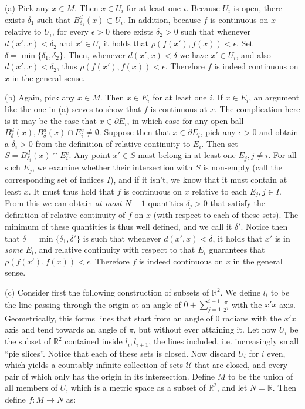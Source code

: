 \begin{solution}
    
    (a) Pick any $x \in M$.
    Then $x \in U_i$ for at least one $i$.
    Because $U_i$ is open, there exists $\delta_1$ such that $B_{\delta_1}^{d}(x) \subset U_i$.
    In addition, because $f$ is continuous on $x$ relative to $U_i$, for every $\epsilon > 0$ there exists $\delta_2 > 0$ such that whenever $d(x', x) < \delta_2$ and $x' \in U_i$ it holds that $\rho(f(x'), f(x)) < \epsilon$.
    Set $\delta = \min\{\delta_1, \delta_2\}$.
    Then, whenever $d(x', x) < \delta$ we have $x' \in U_i$, and also $d(x', x) < \delta_2$, thus $\rho(f(x'), f(x)) < \epsilon$.
    Therefore $f$ is indeed continuous on $x$ in the general sense.

    (b) Again, pick any $x \in M$.
    Then $x \in E_i$ for at least one $i$.
    If $x \in \mathring{E_i}$, an argument like the one in (a) serves to show that $f$ is continuous at $x$.
    The complication here is it may be the case that $x \in \partial E_i$, in which case for any open ball $B_{\delta}^{d}(x), B_{\delta}^{d}(x) \cap E_i^{c} \neq \emptyset$.
    Suppose then that $x \in \partial E_i$, pick any $\epsilon > 0$ and obtain a $\delta_i > 0$ from the definition of relative continuity to $E_i$. 
    Then set $S = B_{\delta_i}^{d}(x) \cap E_i^{c}$.
    Any point $x' \in S$ must belong in at least one $E_j, j \neq i$.
    For all such $E_j$, we examine whether their intersection with $S$ is non-empty (call the corresponding set of indices $I$), and if it isn't, we know that it must contain at least $x$.
    It must thus hold that $f$ is continuous on $x$ relative to each $E_j, j \in I$.
    From this we can obtain \textit{at most} $N - 1$ quantities $\delta_j > 0$ that satisfy the definition of relative continuity of $f$ on $x$ (with respect to each of these sets).
    The minimum of these quantities is thus well defined, and we call it $\delta'$.
    Notice then that $\delta = \min\{\delta_1, \delta'\}$ is such that whenever $d(x', x) < \delta$, it holds that $x'$ is in \textit{some} $E_i$, and relative continuity with respect to that $E_i$ guarantees that $\rho(f(x'), f(x)) < \epsilon$.
    Therefore $f$ is indeed continuous on $x$ in the general sense.

    (c)
    Consider first the following construction of subsets of $\mathbb{R}^2$.
    We define $l_i$ to be the line passing through the origin at an angle of $0 + \sum_{j=1}^{i - 1}\frac{\pi}{2^j}$ with the $x'x$ axis.
    Geometrically, this forms lines that start from an angle of 0 radians with the $x'x$ axis and tend towards an angle of $\pi$, but without ever attaining it.
    Let now $U_i$ be the subset of $\mathbb{R}^2$ contained inside $l_i, l_{i+1}$, the lines included, i.e. increasingly small ``pie slices''.
    Notice that each of these sets is closed.
    Now discard $U_i$ for $i$ even, which yields a countably infinite collection of sets $\mathcal{U}$ that are closed, and every pair of which only has the origin in its intersection.
    Define $M$ to be the union of all members of $U$, which is a metric space as a subset of $\mathbb{R}^2$, and let $N = \mathbb{R}$.
    Then define $f: M \rightarrow N$ as:


\end{solution}
